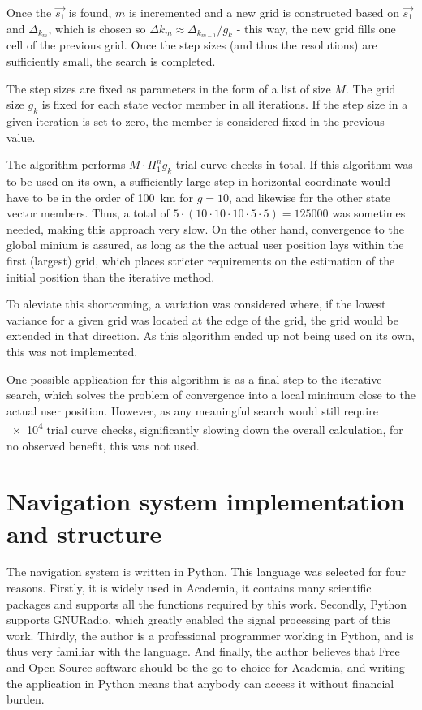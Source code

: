 Once the $\Vec{s_1}$ is found, $m$ is incremented and a new grid is constructed based on $\Vec{s_1}$ and $\Delta_{k_m}$, which is chosen so $\Delta{k_{m}} \approx \Delta_{k_{m-1}} / g_k$ - this way, the new grid fills one cell of the previous grid. Once the step sizes (and thus the resolutions) are sufficiently small, the search is completed.

The step sizes are fixed as parameters in the form of a list of size $M$. The grid size $g_k$ is fixed for each state vector member in all iterations. If the step size in a given iteration is set to zero, the member is considered fixed in the previous value.

The algorithm performs $M \cdot \Pi^n_1 g_k$ trial curve checks in total. If this algorithm was to be used on its own, a sufficiently large step in horizontal coordinate would have to be in the order of \qty{100}{km} for $g = 10$, and likewise for the other state vector members. Thus, a total of $5 \cdot (10 \cdot 10 \cdot 10 \cdot 5 \cdot 5) = \num{125000}$ was sometimes needed, making this approach very slow. On the other hand, convergence to the global minium is assured, as long as the the actual user position lays within the first (largest) grid, which places stricter requirements on the estimation of the initial position than the iterative method.

To aleviate this shortcoming, a variation was considered where, if the lowest variance for a given grid was located at the edge of the grid, the grid would be extended in that direction. As this algorithm ended up not being used on its own, this was not implemented.

One possible application for this algorithm is as a final step to the iterative search, which solves the problem of convergence into a local minimum close to the actual user position. However, as any meaningful search would still require \num{e4} trial curve checks, significantly slowing down the overall calculation, for no observed benefit, this was not used.


\section{Navigation system implementation and structure}
The navigation system is written in Python. This language was selected for four reasons. Firstly, it is widely used in Academia, it contains many scientific packages and supports all the functions required by this work. Secondly, Python supports GNURadio, which greatly enabled the signal processing part of this work. Thirdly, the author is a professional programmer working in Python, and is thus very familiar with the language. And finally, the author believes that Free and Open Source software should be the go-to choice for Academia, and writing the application in Python means that anybody can access it without financial burden.

